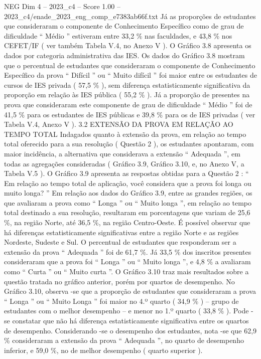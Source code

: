 \begin{textsample}{NEG Dim 4 – 2023\_c4 – Score 1.00 – 2023\_c4/enade\_2023\_eng\_comp\_e7383ab66f.txt}
Já as proporções de estudantes que consideraram o componente de Conhecimento Específico como de grau de dificuldade “ Médio ” estiveram entre 33,2 \% nas faculdades, e 43,8 \% nos CEFET/IF ( ver também Tabela V.4, no Anexo V ).
O Gráfico 3.8 apresenta os dados por categoria administrativa das IES.
Os dados do Gráfico 3.8 mostram que o percentual de estudantes que consideraram o componente de Conhecimento Específico da prova “ Difícil ” ou “ Muito difícil ” foi maior entre os estudantes de cursos de IES privada ( 57,5 \% ), sem diferença estatisticamente significativa da proporção em relação às IES pública ( 55,2 \% ).
Já a proporção de presentes na prova que consideraram este componente de grau de dificuldade “ Médio ” foi de 41,5 \% para os estudantes de IES públicas e 39,8 \% para os de IES privadas ( ver Tabela V.4, Anexo V ). 3.2 EXTENSÃO DA PROVA EM RELAÇÃO AO TEMPO TOTAL Indagados quanto à extensão da prova, em relação ao tempo total oferecido para a sua resolução ( Questão 2 ), os estudantes apontaram, com maior incidência, a alternativa que considerava a extensão “ Adequada ”, em todas as agregações consideradas ( Gráfico 3.9, Gráfico 3.10, e, no Anexo V, a Tabela V.5 ).
O Gráfico 3.9 apresenta as respostas obtidas para a Questão 2 : “ Em relação ao tempo total de aplicação, você considera que a prova foi longa ou muito longa? ” Em relação aos dados do Gráfico 3.9, entre as grandes regiões, os que avaliaram a prova como “ Longa ” ou “ Muito longa ”, em relação ao tempo total destinado a sua resolução, resultaram em porcentagens que variam de 25,6 \%, na região Norte, até 36,5 \%, na região Centro-Oeste.
É possível observar que há diferenças estatisticamente significativas entre a região Norte e as regiões Nordeste, Sudeste e Sul.
O percentual de estudantes que responderam ser a extensão da prova “ Adequada ” foi de 61,7 \%.
Já 33,5 \% dos inscritos presentes consideraram que a prova foi “ Longa ” ou “ Muito longa ”, e 4,8 \% a avaliaram como “ Curta ” ou “ Muito curta ”.
O Gráfico 3.10 traz mais resultados sobre a questão tratada no gráfico anterior, porém por quartos de desempenho.
No Gráfico 3.10, observa -se que a proporção de estudantes que consideraram a prova “ Longa ” ou “ Muito Longa ” foi maior no 4.º quarto ( 34,9 \% ) – grupo de estudantes com o melhor desempenho – e menor no 1.º quarto ( 33,8 \% ).
Pode -se constatar que não há diferença estatisticamente significativa entre os quartos de desempenho.
Considerando -se o desempenho dos estudantes, nota -se que 62,9 \% consideraram a extensão da prova “ Adequada ”, no quarto de desempenho inferior, e 59,0 \%, no de melhor desempenho ( quarto superior ).

\end{textsample}
